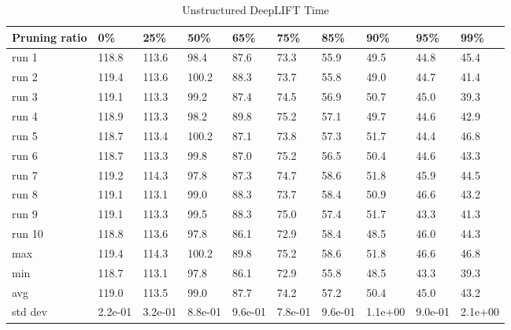 \documentclass[journal,onecolumn,12pt]{IEEEtran}
\begin{document}
\begin{table}[htbp]
    \caption{Unstructured DeepLIFT Time}
    \begin{center}
    \begin{tabular}{ |p{2cm}|p{1cm}|p{1cm}|p{1cm}|p{1cm}|p{1cm}|p{1cm}|p{1cm}|p{1cm}|p{1cm}|  }
     \hline
     Pruning ratio  & 0\% & 25\%& 50\%& 65\%& 75\%& 85\%& 90\%& 95\%& 99\%\\
     \hline
        run 1&118.8&113.6&98.4&87.6&73.3&55.9&49.5&44.8&45.4\\
        run 2&119.4&113.6&100.2&88.3&73.7&55.8&49.0&44.7&41.4\\
        run 3&119.1&113.3&99.2&87.4&74.5&56.9&50.7&45.0&39.3\\
        run 4&118.9&113.3&98.2&89.8&75.2&57.1&49.7&44.6&42.9\\
        run 5&118.7&113.4&100.2&87.1&73.8&57.3&51.7&44.4&46.8\\
        run 6&118.7&113.3&99.8&87.0&75.2&56.5&50.4&44.6&43.3\\
        run 7&119.2&114.3&97.8&87.3&74.7&58.6&51.8&45.9&44.5\\
        run 8&119.1&113.1&99.0&88.3&73.7&58.4&50.9&46.6&43.2\\
        run 9&119.1&113.3&99.5&88.3&75.0&57.4&51.7&43.3&41.3\\
        run 10&118.8&113.6&97.8&86.1&72.9&58.4&48.5&46.0&44.3\\
     \hline
        max     &119.4&114.3&100.2&89.8&75.2&58.6&51.8&46.6&46.8\\
        min     &118.7&113.1&97.8&86.1&72.9&55.8&48.5&43.3&39.3\\
        avg     &119.0&113.5&99.0&87.7&74.2&57.2&50.4&45.0&43.2\\
        std dev &2.2e-01&3.2e-01&8.8e-01&9.6e-01&7.8e-01&9.6e-01&1.1e+00&9.0e-01&2.1e+00\\
     \hline
    \end{tabular}
    \end{center}
    \label{tab:a6}
\end{table}
\end{document}
